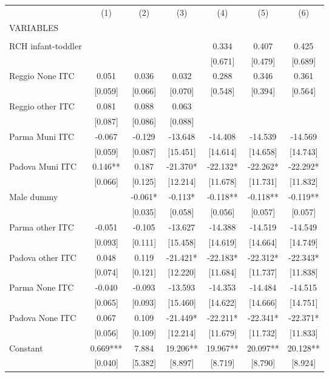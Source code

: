 \begin{tabular}{lcccccc} \hline
 & (1) & (2) & (3) & (4) & (5) & (6) \\
VARIABLES &  &  &  &  &  &  \\ \hline
 &  &  &  &  &  &  \\
RCH infant-toddler &  &  &  & 0.334 & 0.407 & 0.425 \\
 &  &  &  & [0.671] & [0.479] & [0.689] \\
Reggio None ITC & 0.051 & 0.036 & 0.032 & 0.288 & 0.346 & 0.361 \\
 & [0.059] & [0.066] & [0.070] & [0.548] & [0.394] & [0.564] \\
Reggio other ITC & 0.081 & 0.088 & 0.063 &  &  &  \\
 & [0.087] & [0.086] & [0.088] &  &  &  \\
Parma Muni ITC & -0.067 & -0.129 & -13.648 & -14.408 & -14.539 & -14.569 \\
 & [0.059] & [0.087] & [15.451] & [14.614] & [14.658] & [14.743] \\
Padova Muni ITC & 0.146** & 0.187 & -21.370* & -22.132* & -22.262* & -22.292* \\
 & [0.066] & [0.125] & [12.214] & [11.678] & [11.731] & [11.832] \\
Male dummy &  & -0.061* & -0.113* & -0.118** & -0.118** & -0.119** \\
 &  & [0.035] & [0.058] & [0.056] & [0.057] & [0.057] \\
Parma other ITC & -0.051 & -0.105 & -13.627 & -14.388 & -14.519 & -14.549 \\
 & [0.093] & [0.111] & [15.458] & [14.619] & [14.664] & [14.749] \\
Padova other ITC & 0.048 & 0.119 & -21.421* & -22.183* & -22.312* & -22.343* \\
 & [0.074] & [0.121] & [12.220] & [11.684] & [11.737] & [11.838] \\
Parma None ITC & -0.040 & -0.093 & -13.593 & -14.353 & -14.484 & -14.515 \\
 & [0.065] & [0.093] & [15.460] & [14.622] & [14.666] & [14.751] \\
Padova None ITC & 0.067 & 0.109 & -21.449* & -22.211* & -22.341* & -22.371* \\
 & [0.056] & [0.109] & [12.214] & [11.679] & [11.732] & [11.833] \\
Constant & 0.669*** & 7.884 & 19.206** & 19.967** & 20.097** & 20.128** \\
 & [0.040] & [5.382] & [8.897] & [8.719] & [8.790] & [8.924] \\

\end{tabular}

